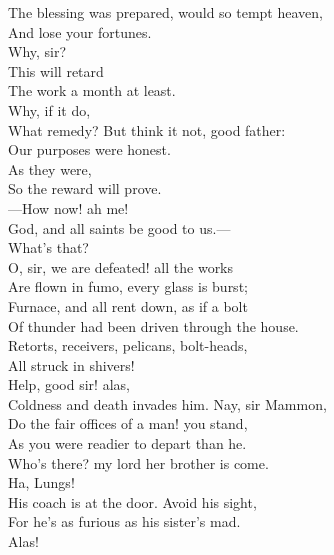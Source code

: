 \documentclass[a4paper,oneside]{memoir}
\begin{document}
\begin{drama*}
The blessing was prepared, would so tempt heaven,\\
And lose your fortunes.\\
\mammonspeaks {} Why, sir?\\
\subtlespeaks {} This will retard\\
The work a month at least.\\
\mammonspeaks {} Why, if it do,\\
What remedy? But think it not, good father:\\
Our purposes were honest.\\
\subtlespeaks {} As they were,\\
So the reward will prove.\\
 ---How now! ah me!\\
God, and all saints be good to us.---\\
 What's that?\\
\facespeaks O, sir, we are defeated! all the works\\
Are flown in fumo, every glass is burst;\\
Furnace, and all rent down, as if a bolt\\
Of thunder had been driven through the house.\\
Retorts, receivers, pelicans, bolt-heads,\\
All struck in shivers!\\
 Help, good sir! alas,\\
Coldness and death invades him. Nay, sir Mammon,\\
Do the fair offices of a man! you stand,\\
As you were readier to depart than he.\\
Who's there? my lord her brother is come.\\
\mammonspeaks {} Ha, Lungs!\\
\facespeaks His coach is at the door. Avoid his sight,\\
For he's as furious as his sister's mad.\\
\mammonspeaks Alas!\\

\end{drama*}
\end{document}
